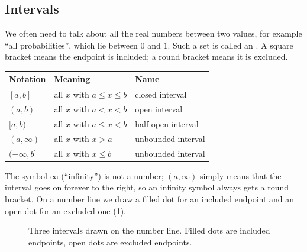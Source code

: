 \subsection{Intervals}

We often need to talk about all the real numbers between two values, for
example ``all probabilities'', which lie between $0$ and $1$. Such a set is
called an . A square bracket means the endpoint is included; a
round bracket means it is excluded.

\begin{center}
\renewcommand{\arraystretch}{1.25}
\begin{tabular}{@{}lll@{}}
\toprule
\textbf{Notation} & \textbf{Meaning} & \textbf{Name} \\
\midrule
$[a,b]$ & all $x$ with $a \le x \le b$ & closed interval \\
$(a,b)$ & all $x$ with $a < x < b$ & open interval \\
$[a,b)$ & all $x$ with $a \le x < b$ & half-open interval \\
$(a,\infty)$ & all $x$ with $x > a$ & unbounded interval \\
$(-\infty,b]$ & all $x$ with $x \le b$ & unbounded interval \\
\bottomrule
\end{tabular}
\end{center}

The symbol $\infty$ (``infinity'') is not a number; $(a,\infty)$ simply means
that the interval goes on forever to the right, so an infinity symbol always
gets a round bracket. On a number line we draw a filled dot for an included
endpoint and an open dot for an excluded one (\cref{fig:intervals}).

\begin{figure}[htbp]
\centering
{}
\caption{Three intervals drawn on the number line. Filled dots are included
  endpoints, open dots are excluded endpoints.}
\label{fig:intervals}
\end{figure}

